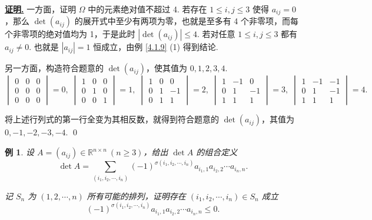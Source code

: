 \documentclass[10pt,openany]{article}
\theoremstyle{thmstyle} %
\theoremstyle{defstyle} %
\theoremstyle{prostyle} %
\theoremstyle{exastyle}
\newtheorem{example}[theorem]{例}
\theoremstyle{remstyle}
\renewenvironment{proof}[1][证明]{\par\underline{\textbf{#1.}} \;\fangsong}{\qed\par}
\newcommand{\R}{\mathbb{R}}
\newcommand{\n}{^{n \times n}}
\begin{document}
\begin{proof}
	一方面，证明 \( \Omega \) 中的元素绝对值不超过 4. 若存在 \( 1 \leq i,j \leq 3 \) 使得 \( a_{ij}=0 \)，那么 \( \det(a_{ij}) \) 的展开式中至少有两项为零，也就是至多有 4 个非零项，而每个非零项的绝对值均为 1，于是此时 \( |\det(a_{ij})| \leq 4 \). 若对任意 \( 1 \leq i,j \leq 3 \) 都有 \( a_{ij} \neq 0 \). 也就是 \( |a_{ij}|=1 \) 恒成立，由例 \ref{4.1.9} (1) 得到结论. 
	
	另一方面，构造符合题意的 \( \det (a_{ij}) \)，使其值为 \( 0,1,2,3,4 \). 
	\[ \begin{vmatrix}
		0 & 0 & 0 \\
		0 & 0 & 0 \\
		0 & 0 & 0
	\end{vmatrix}=0, \; \begin{vmatrix}
		1 & 0 & 0 \\
		0 & 1 & 0 \\
		0 & 0 & 1
	\end{vmatrix}=1, \; \begin{vmatrix}
		1 & 0 & 0 \\
		0 & 1 & -1 \\
		0 & 1 & 1
	\end{vmatrix}=2, \; \begin{vmatrix}
		1 & -1 & 0 \\
		0 & 1 & -1 \\
		1 & 1 & 1
	\end{vmatrix}=3, \; \begin{vmatrix}
		1 & -1 & -1 \\
		0 & 1 & -1 \\
		1 & 1 & 1
	\end{vmatrix}=4. \]
	
	将上述行列式的第一行全变为其相反数，就得到符合题意的 \( \det (a_{ij}) \)，其值为 \( 0,-1,-2,-3,-4 \). 
\end{proof}


\begin{example}
	设 \( A=(a_{ij}) \in \R\n \ (n \geq 3) \)，给出 \( \det A \) 的组合定义
	\[
	\det A=\sum_{(i_1,i_2,\cdots,i_n)} 	(-1)^{\sigma(i_1,i_2,\cdots,i_n)} a_{i_1,1} a_{i_2,2}\cdots a_{i_n,n}.
	\]
	
	记 \( S_n \) 为 \( (1,2,\cdots,n) \) 所有可能的排列，证明存在 \( (i_1,i_2,\cdots,i_n) \in S_n \) 成立
	\[
	(-1)^{\sigma(i_1,i_2,\cdots,i_n)} a_{i_1,1} a_{i_2,2}\cdots a_{i_n,n} \leq 0.
	\]
\end{example}
\end{document}
